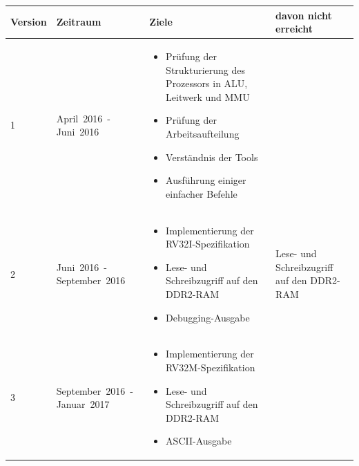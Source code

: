 \begin{table}[H]
\begin{tabular}{|p{50pt}|p{80pt}|p{220pt}|p{110pt}|}
\hline
Version & Zeitraum                                   & Ziele                                                                            & davon nicht erreicht                          \\
\hline
1       & \mbox{April 2016 -} \mbox{Juni 2016}       & \begin{itemize}[noitemsep,topsep=0pt]
                                                       \item Pr\"ufung der Strukturierung des Prozessors in ALU, Leitwerk und MMU
                                                       \item Pr\"ufung der Arbeitsaufteilung
                                                       \item Verst\"andnis der Tools
                                                       \item Ausf\"uhrung einiger einfacher Befehle
                                                       \end{itemize}                                                                    &                                               \\
\hline
2       & \mbox{Juni 2016 -} \mbox{September 2016}   & \begin{itemize}[noitemsep,topsep=0pt]
                                                       \item Implementierung der RV32I-Spezifikation
                                                       \item Lese- und Schreibzugriff auf den DDR2-RAM
                                                       \item Debugging-Ausgabe
                                                       \end{itemize}                                                                    & Lese- und Schreibzugriff auf den DDR2-RAM     \\
\hline
3       & \mbox{September 2016 -} \mbox{Januar 2017} & \begin{itemize}[noitemsep,topsep=0pt]
                                                       \item Implementierung der RV32M-Spezifikation
                                                       \item Lese- und Schreibzugriff auf den DDR2-RAM
                                                       \item ASCII-Ausgabe

\end{itemize}
\end{tabular}
\end{table}
